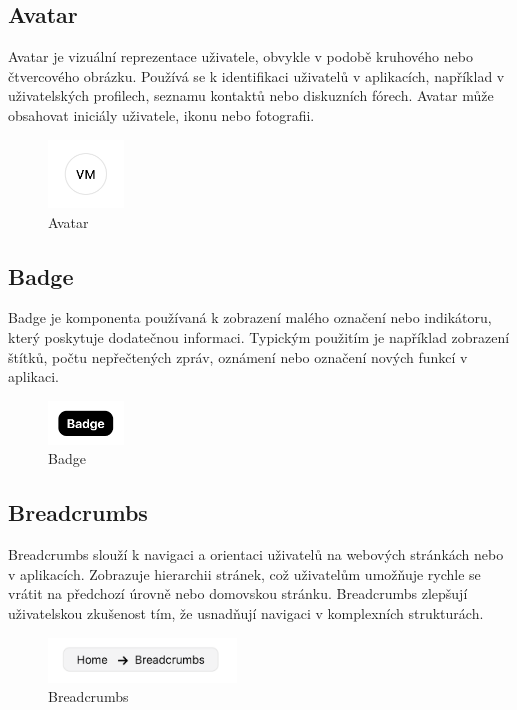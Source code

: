 \subsection{Avatar}
Avatar je vizuální reprezentace uživatele, obvykle v podobě kruhového nebo čtvercového obrázku. Používá se k identifikaci uživatelů v aplikacích, například v uživatelských profilech, seznamu kontaktů nebo diskuzních fórech. Avatar může obsahovat iniciály uživatele, ikonu nebo fotografii.

\begin{figure}[H]
  \centering
  \includegraphics[width=2cm]{images/avatar}
  \captionsetup{justification=centering,margin=2cm}
  \caption{Avatar} \label{picture:avatar}
\end{figure}

\subsection{Badge}
Badge je komponenta používaná k zobrazení malého označení nebo indikátoru, který poskytuje dodatečnou informaci. Typickým použitím je například zobrazení štítků, počtu nepřečtených zpráv, oznámení nebo označení nových funkcí v aplikaci.

\begin{figure}[H]
  \centering
  \includegraphics[width=2cm]{images/badge}
  \captionsetup{justification=centering,margin=2cm}
  \caption{Badge} \label{picture:badge}
\end{figure}

\subsection{Breadcrumbs}
Breadcrumbs slouží k navigaci a orientaci uživatelů na webových stránkách nebo v aplikacích. Zobrazuje hierarchii stránek, což uživatelům umožňuje rychle se vrátit na předchozí úrovně nebo domovskou stránku. Breadcrumbs zlepšují uživatelskou zkušenost tím, že usnadňují navigaci v komplexních strukturách.

\begin{figure}[H]
  \centering
  \includegraphics[width=5cm]{images/breadcrumbs}
  \captionsetup{justification=centering,margin=2cm}
  \caption{Breadcrumbs} \label{picture:breadcrumbs}
\end{figure}

